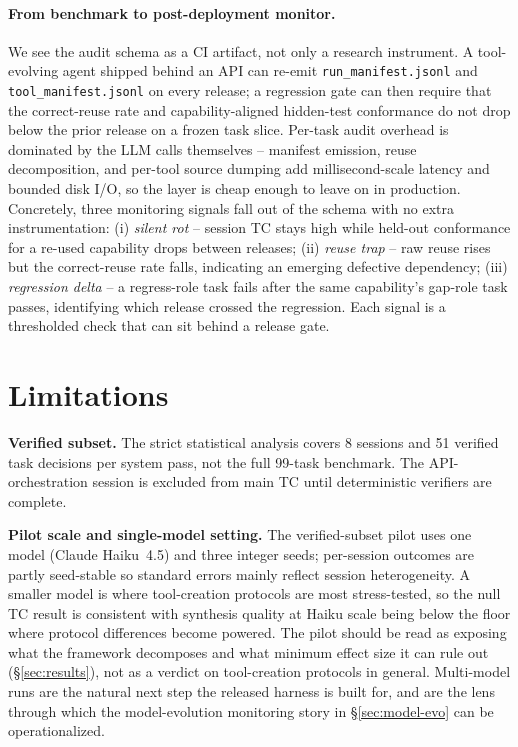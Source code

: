 \documentclass[sigconf,anonymous,review,natbib=false]{acmart}
\begin{document}
\paragraph{From benchmark to post-deployment monitor.}
\label{sec:deploy}
We see the audit schema as a CI artifact, not only a research instrument. A tool-evolving agent shipped behind an API can re-emit \texttt{run\_manifest.jsonl} and \texttt{tool\_manifest.jsonl} on every release; a regression gate can then require that the correct-reuse rate and capability-aligned hidden-test conformance do not drop below the prior release on a frozen task slice. Per-task audit overhead is dominated by the LLM calls themselves -- manifest emission, reuse decomposition, and per-tool source dumping add millisecond-scale latency and bounded disk I/O, so the layer is cheap enough to leave on in production. Concretely, three monitoring signals fall out of the schema with no extra instrumentation: (i) \emph{silent rot} -- session TC stays high while held-out conformance for a re-used capability drops between releases; (ii) \emph{reuse trap} -- raw reuse rises but the correct-reuse rate falls, indicating an emerging defective dependency; (iii) \emph{regression delta} -- a regress-role task fails after the same capability's gap-role task passes, identifying which release crossed the regression. Each signal is a thresholded check that can sit behind a release gate.

\section{Limitations}

\textbf{Verified subset.} The strict statistical analysis covers 8 sessions and 51 verified task decisions per system pass, not the full 99-task benchmark. The API-orchestration session is excluded from main TC until deterministic verifiers are complete.

\textbf{Pilot scale and single-model setting.} The verified-subset pilot uses one model (Claude Haiku~4.5) and three integer seeds; per-session outcomes are partly seed-stable so standard errors mainly reflect session heterogeneity. A smaller model is where tool-creation protocols are most stress-tested, so the null TC result is consistent with synthesis quality at Haiku scale being below the floor where protocol differences become powered. The pilot should be read as exposing what the framework decomposes and what minimum effect size it can rule out (\S\ref{sec:results}), not as a verdict on tool-creation protocols in general. Multi-model runs are the natural next step the released harness is built for, and are the lens through which the model-evolution monitoring story in \S\ref{sec:model-evo} can be operationalized.
\end{document}
